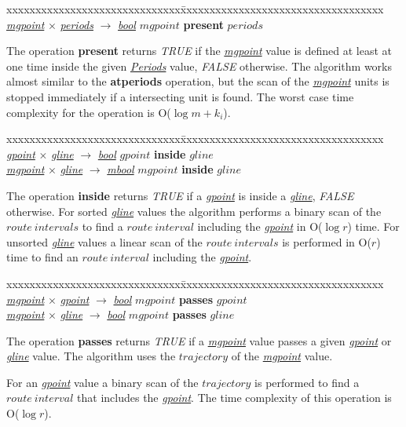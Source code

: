 \documentclass[a4paper]{article}
\newcommand{\op}[1]{\textbf{#1}}
\newcommand{\dt}[1]{\textsl{\underline{#1}}}
\newcommand{\true}{\textsl{TRUE}}
\newcommand{\false}{\textsl{FALSE}}
\begin{document}
\begin{tabbing}
xxxxxxxxxxxxxxxxxxxxxxxxxxxxxx\=xxxxxxxxxxxxxxxxxxxxxxxxxxxxxxxxxxx\kill
\dt{mgpoint} $\times$ \dt{periods} $\rightarrow$ \dt{bool} \> $mgpoint$ \op{present} $periods$\\
\end{tabbing}
The operation \op{present} returns \true{} if the \dt{mgpoint} value is
defined at least at one time inside the given \dt{Periods} value, \false{}
otherwise. The algorithm works almost similar to the \op{atperiods} operation, but
the scan of the \dt{mgpoint} units is stopped immediately if a intersecting unit
is found. The worst case time complexity for the operation is O($\log {m} + k_i$).
\begin{tabbing}
xxxxxxxxxxxxxxxxxxxxxxxxxxxxxx\=xxxxxxxxxxxxxxxxxxxxxxxxxxxxxxxxxxx\kill
\dt{gpoint} $\times$ \dt{gline} $\rightarrow$ \dt{bool} \> $gpoint$ \op{inside} $gline$\\
\dt{mgpoint} $\times$ \dt{gline} $\rightarrow$ \dt{mbool} \> $mgpoint$ \op{inside} $gline$\\
\end{tabbing}
The operation \op{inside} returns \true{} if a \dt{gpoint} is inside a \dt{gline},
\false{} otherwise. For sorted \dt{gline} values the algorithm performs a binary
scan of the $route\ intervals$ to find a $route\ interval$ including the
\dt{gpoint} in O($\log r$) time. For unsorted \dt{gline} values a linear scan of
the $route\ intervals$ is performed in O($r$) time to find an $route\ interval$
including the \dt{gpoint}.
\begin{tabbing}
xxxxxxxxxxxxxxxxxxxxxxxxxxxxxx\=xxxxxxxxxxxxxxxxxxxxxxxxxxxxxxxxxxx\kill
\dt{mgpoint} $\times$ \dt{gpoint} $\rightarrow$ \dt{bool} \> $mgpoint$ \op{passes} $gpoint$\\
\dt{mgpoint} $\times$ \dt{gline} $\rightarrow$ \dt{bool} \> $mgpoint$ \op{passes} $gline$\\
\end{tabbing}
The operation \op{passes} returns \true{} if a \dt{mgpoint} value passes a
given \dt{gpoint} or \dt{gline} value. The algorithm uses the $trajectory$ of the \dt{mgpoint} value.

For an \dt{gpoint} value a binary scan of the $trajectory$ is performed to find a
$route\ interval$ that includes the \dt{gpoint}. The time complexity of this operation is O($\log r$).
\end{document}
